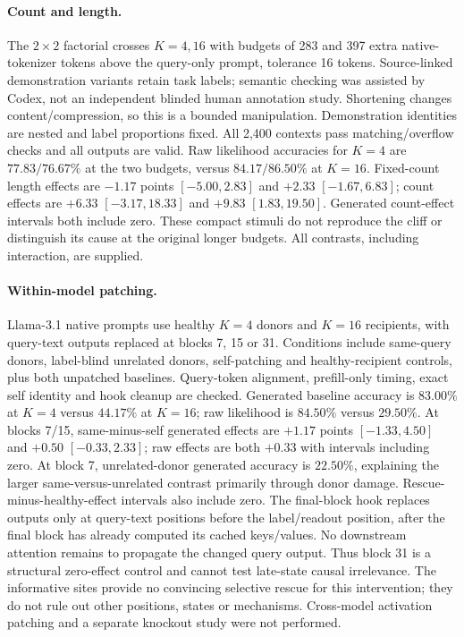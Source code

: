 \paragraph{Count and length.} The $2\times2$ factorial crosses $K=4,16$ with budgets of 283 and 397 extra native-tokenizer tokens above the query-only prompt, tolerance 16 tokens. Source-linked demonstration variants retain task labels; semantic checking was assisted by Codex, not an independent blinded human annotation study. Shortening changes content/compression, so this is a bounded manipulation. Demonstration identities are nested and label proportions fixed. All 2,400 contexts pass matching/overflow checks and all outputs are valid. Raw likelihood accuracies for $K=4$ are $77.83/76.67\%$ at the two budgets, versus $84.17/86.50\%$ at $K=16$. Fixed-count length effects are $-1.17$ points $[-5.00,2.83]$ and $+2.33$ $[-1.67,6.83]$; count effects are $+6.33$ $[-3.17,18.33]$ and $+9.83$ $[1.83,19.50]$. Generated count-effect intervals both include zero. These compact stimuli do not reproduce the cliff or distinguish its cause at the original longer budgets. All contrasts, including interaction, are supplied.

\paragraph{Within-model patching.} Llama-3.1 native prompts use healthy $K=4$ donors and $K=16$ recipients, with query-text outputs replaced at blocks 7, 15 or 31. Conditions include same-query donors, label-blind unrelated donors, self-patching and healthy-recipient controls, plus both unpatched baselines. Query-token alignment, prefill-only timing, exact self identity and hook cleanup are checked. Generated baseline accuracy is $83.00\%$ at $K=4$ versus $44.17\%$ at $K=16$; raw likelihood is $84.50\%$ versus $29.50\%$. At blocks 7/15, same-minus-self generated effects are $+1.17$ points $[-1.33,4.50]$ and $+0.50$ $[-0.33,2.33]$; raw effects are both $+0.33$ with intervals including zero. At block 7, unrelated-donor generated accuracy is $22.50\%$, explaining the larger same-versus-unrelated contrast primarily through donor damage. Rescue-minus-healthy-effect intervals also include zero. The final-block hook replaces outputs only at query-text positions before the label/readout position, after the final block has already computed its cached keys/values. No downstream attention remains to propagate the changed query output. Thus block 31 is a structural zero-effect control and cannot test late-state causal irrelevance. The informative sites provide no convincing selective rescue for this intervention; they do not rule out other positions, states or mechanisms. Cross-model activation patching and a separate knockout study were not performed.


